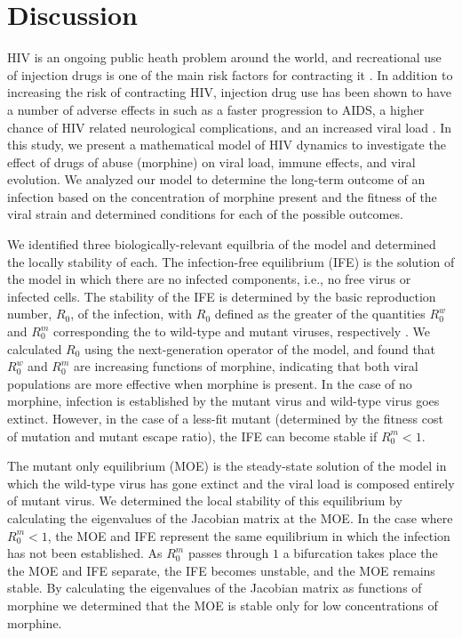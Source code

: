 \documentclass[11pt, oneside]{article}    %
\begin{document}
\section{Discussion}

HIV is an ongoing public heath problem around the world, and recreational use of injection drugs is one of the main risk factors for contracting it \cite{Alcabes}. In addition to increasing the risk of contracting HIV, injection drug use has been shown to have a number of adverse effects in such as a faster progression to AIDS, a higher chance of HIV related neurological complications, and an increased viral load \cite{Kumar,Hauser}. In this study, we present a mathematical model of HIV dynamics to investigate the effect of drugs of abuse (morphine) on viral load, immune effects, and viral evolution. We analyzed our model to determine the long-term outcome of an infection based on the concentration of morphine present and the fitness of the viral strain and determined conditions for each of the possible outcomes.

\vspace{5mm}

	We identified three biologically-relevant equilbria of the model and determined the locally stability of each. The infection-free equilibrium (IFE) is the solution of the model in which there are no infected components, i.e., no free virus or infected cells. The stability of the IFE is determined by the basic reproduction number, $R_0$, of the infection, with $R_0$ defined as the greater of the quantities $R_0^w$ and $R_0^m$ corresponding the to wild-type and mutant viruses, respectively \cite{Castillo-Chavez}. We calculated $R_0$ using the next-generation operator of the model, and found that $R_0^w$ and $R_0^m$ are increasing functions of morphine, indicating that both viral populations are more effective when morphine is present. In the case of no morphine, infection is established by the mutant virus and wild-type virus goes extinct. However, in the case of a less-fit mutant (determined by the fitness cost of mutation and mutant escape ratio), the IFE can become stable if $R_0^m < 1$.

\vspace{5mm}

	The mutant only equilibrium (MOE) is the steady-state solution of the model in which the wild-type virus has gone extinct and the viral load is composed entirely of mutant virus. We determined the local stability of this equilibrium by calculating the eigenvalues of the Jacobian matrix at the MOE. In the case where $R_0^m < 1$, the MOE and IFE represent the same equilibrium in which the infection has not been established. As $R_0^m$ passes through $1$ a bifurcation takes place the the MOE and IFE separate, the IFE becomes unstable, and the MOE remains stable. By calculating the eigenvalues of the Jacobian matrix as functions of morphine we determined that the MOE is stable only for low concentrations of morphine. 
\end{document}
